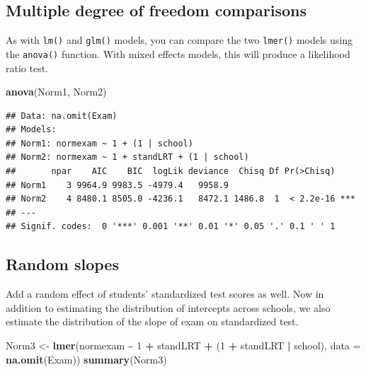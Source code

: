 \documentclass[
]{book}
\newenvironment{Shaded}{\begin{snugshade}}{\end{snugshade}}
\newcommand{\DataTypeTok}[1]{\textcolor[rgb]{0.13,0.29,0.53}{#1}}
\newcommand{\DecValTok}[1]{\textcolor[rgb]{0.00,0.00,0.81}{#1}}
\newcommand{\KeywordTok}[1]{\textcolor[rgb]{0.13,0.29,0.53}{\textbf{#1}}}
\newcommand{\NormalTok}[1]{#1}
\newcommand{\OperatorTok}[1]{\textcolor[rgb]{0.81,0.36,0.00}{\textbf{#1}}}
\newcommand{\StringTok}[1]{\textcolor[rgb]{0.31,0.60,0.02}{#1}}
\begin{document}
\hypertarget{multiple-degree-of-freedom-comparisons}{%
\subsection{Multiple degree of freedom comparisons}\label{multiple-degree-of-freedom-comparisons}}

As with \texttt{lm()} and \texttt{glm()} models, you can compare the two \texttt{lmer()} models using the \texttt{anova()} function. With mixed effects models, this will produce a likelihood ratio test.

\begin{Shaded}
\begin{Highlighting}[]
  \KeywordTok{anova}\NormalTok{(Norm1, Norm2)}
\end{Highlighting}
\end{Shaded}

\begin{verbatim}
## Data: na.omit(Exam)
## Models:
## Norm1: normexam ~ 1 + (1 | school)
## Norm2: normexam ~ 1 + standLRT + (1 | school)
##       npar    AIC    BIC  logLik deviance  Chisq Df Pr(>Chisq)    
## Norm1    3 9964.9 9983.5 -4979.4   9958.9                         
## Norm2    4 8480.1 8505.0 -4236.1   8472.1 1486.8  1  < 2.2e-16 ***
## ---
## Signif. codes:  0 '***' 0.001 '**' 0.01 '*' 0.05 '.' 0.1 ' ' 1
\end{verbatim}

\hypertarget{random-slopes}{%
\subsection{Random slopes}\label{random-slopes}}

Add a random effect of students' standardized test scores as well. Now in addition to estimating the distribution of intercepts across schools, we also estimate the distribution of the slope of exam on standardized test.

\begin{Shaded}
\begin{Highlighting}[]
\NormalTok{  Norm3 \textless{}{-}}\StringTok{ }\KeywordTok{lmer}\NormalTok{(normexam }\OperatorTok{\textasciitilde{}}\StringTok{ }\DecValTok{1} \OperatorTok{+}\StringTok{ }\NormalTok{standLRT }\OperatorTok{+}\StringTok{ }\NormalTok{(}\DecValTok{1} \OperatorTok{+}\StringTok{ }\NormalTok{standLRT }\OperatorTok{|}\StringTok{ }\NormalTok{school), }
                \DataTypeTok{data =} \KeywordTok{na.omit}\NormalTok{(Exam)) }
  \KeywordTok{summary}\NormalTok{(Norm3) }
\end{Highlighting}
\end{Shaded}
\end{document}
